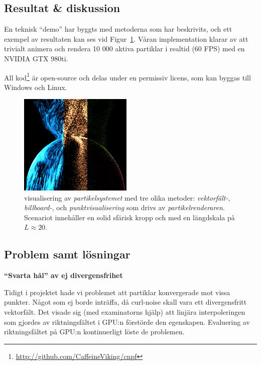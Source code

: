 \documentclass[a4paper]{article}
\begin{document}
\begin{multicols}{2}
\section{Resultat \& diskussion} \label{sec:results}

En teknisk ``demo'' har byggts med metoderna som har beskrivits, och ett exempel av resultaten kan ses vid Figur~\ref{fig:verysexy}. Våran implementation klarar av att trivialt animera och rendera 10 000 aktiva partiklar i realtid (60 FPS) med en NVIDIA GTX 980ti.

All kod\footnote{\url{http://github.com/CaffeineViking/cnpf}} är open-source och delas under en permissiv licens, som kan byggas till Windows och Linux.

\begin{figure}[H]
\center
\includegraphics[width=0.48\textwidth]{share/merged_shaders.png}
    \caption{visualisering av \emph{partikelsystemet} med tre olika metoder: \emph{vektorfält-}, \emph{billboard-}, och \emph{punktvisualisering} som drivs av \emph{partikelrenderaren}. Scenariot innehåller en solid sfärisk kropp och med en längdskala på \(L\approx20\).}
\label{fig:verysexy}
\end{figure}

\vspace{-0.8cm}
        \subsection{Problem samt lösningar}

            \textbf{``Svarta hål'' av ej divergensfrihet}

            Tidigt i projektet hade vi problemet att partiklar konvergerade mot vissa punkter. Något som ej borde inträffa, då curl-noise skall vara ett divergensfritt vektorfält. Det visade sig (med examinatorns hjälp) att linjära interpoleringen som gjordes av riktningsfältet i GPU:n förstörde den egenskapen. Evaluering av riktningsfältet på GPU:n kontinuerligt löste de problemen.


\end{multicols}
\end{document}
